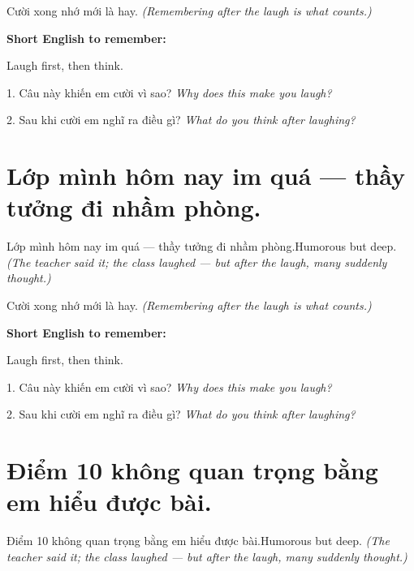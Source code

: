 \begin{baihoc}
Cười xong nhớ mới là hay.
\textit{(Remembering after the laugh is what counts.)}
\end{baihoc}

\begin{ghinhoanh}
\textbf{Short English to remember:}

Laugh first, then think.

\end{ghinhoanh}

\begin{tuhocnhanh}
1. Câu này khiến em cười vì sao? \textit{Why does this make you laugh?}

2. Sau khi cười em nghĩ ra điều gì? \textit{What do you think after laughing?}
\end{tuhocnhanh}
\ngancach


\section{Lớp mình hôm nay im quá — thầy tưởng đi nhầm phòng.}
\begin{truyen}{Lớp mình hôm nay im quá — thầy tưởng đi nhầm phòng.}{Humorous but deep.}
\textit{(The teacher said it; the class laughed — but after the laugh, many suddenly thought.)}
\end{truyen}

\begin{baihoc}
Cười xong nhớ mới là hay.
\textit{(Remembering after the laugh is what counts.)}
\end{baihoc}

\begin{ghinhoanh}
\textbf{Short English to remember:}

Laugh first, then think.

\end{ghinhoanh}

\begin{tuhocnhanh}
1. Câu này khiến em cười vì sao? \textit{Why does this make you laugh?}

2. Sau khi cười em nghĩ ra điều gì? \textit{What do you think after laughing?}
\end{tuhocnhanh}
\ngancach


\section{Điểm 10 không quan trọng bằng em hiểu được bài.}
\begin{truyen}{Điểm 10 không quan trọng bằng em hiểu được bài.}{Humorous but deep.}
\textit{(The teacher said it; the class laughed — but after the laugh, many suddenly thought.)}
\end{truyen}

